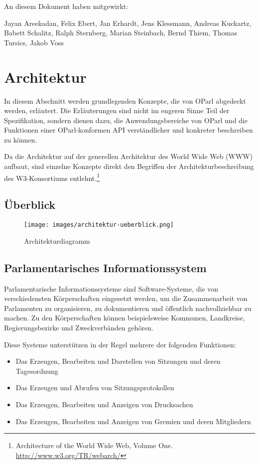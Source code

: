 \documentclass[,a4paper]{article}
\makeatletter
\def\maxwidth{\ifdim\Gin@nat@width>\linewidth\linewidth
\else\Gin@nat@width\fi}
\let\Oldincludegraphics\includegraphics
\renewcommand{\includegraphics}[1]{\Oldincludegraphics[width=\maxwidth]{#1}}
\makeatother
\begin{document}
An diesem Dokument haben mitgewirkt:

Jayan Areekadan, Felix Ebert, Jan Erhardt, Jens Klessmann, Andreas
Kuckartz, Babett Schalitz, Ralph Sternberg, Marian Steinbach, Bernd
Thiem, Thomas Tursics, Jakob Voss

\section{Architektur}\label{architektur}

In diesem Abschnitt werden grundlegenden Konzepte, die von OParl
abgedeckt werden, erläutert. Die Erläuterungen sind nicht im engeren
Sinne Teil der Spezifikation, sondern dienen dazu, die
Anwendungsbereiche von OParl und die Funktionen einer OParl-konformen
API verständlicher und konkreter beschreiben zu können.

Da die Architektur auf der generellen Architektur des World Wide Web
(WWW) aufbaut, sind einzelne Konzepte direkt den Begriffen der
Architekturbeschreibung des W3-Konsortiums entlehnt.\footnote{Architecture
  of the World Wide Web, Volume One. \url{http://www.w3.org/TR/webarch/}}

\subsection{Überblick}\label{uxfcberblick}

\begin{figure}[htbp]
\centering
\texttt{[image: images/architektur-ueberblick.png]}
\caption{Architekturdiagramm}
\end{figure}

\subsection{Parlamentarisches
Informationssystem}\label{parlamentarischesux5finfosystem}

Parlamentarische Informationssysteme sind Software-Systeme, die von
verschiedensten Körperschaften eingesetzt werden, um die Zusammenarbeit
von Parlamenten zu organisieren, zu dokumentieren und öffentlich
nachvollziehbar zu machen. Zu den Körperschaften können beispielsweise
Kommunen, Landkreise, Regierungsbezirke und Zweckverbänden gehören.

Diese Systeme unterstützen in der Regel mehrere der folgenden
Funktionen:

\begin{itemize}
\itemsep1pt\parskip0pt
\item
  Das Erzeugen, Bearbeiten und Darstellen von Sitzungen und deren
  Tagesordnung
\item
  Das Erzeugen und Abrufen von Sitzungsprotokollen
\item
  Das Erzeugen, Bearbeiten und Anzeigen von Drucksachen
\item
  Das Erzeugen, Bearbeiten und Anzeigen von Gremien und deren
  Mitgliedern
\end{itemize}
\end{document}
